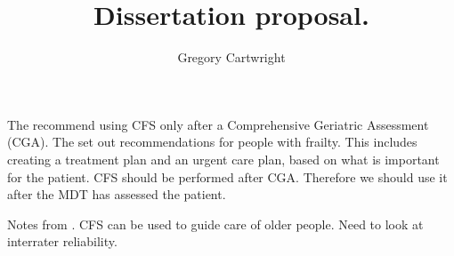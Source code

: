 \documentclass[12pt,a4paper,oneside,titlepage]{article}
\begin{document}
\author{Gregory Cartwright}
\title{Dissertation proposal.}
\maketitle
The \textcite[][page 8]{bgs:14} recommend using CFS only after a Comprehensive Geriatric Assessment (CGA).
The \textcite{bgs:14} set out recommendations for people with frailty. This includes creating a treatment plan and an urgent care plan, based on what is important for the patient.
CFS should be performed after CGA. Therefore we should use it after the MDT has assessed the patient.

Notes from \textcite{rockwood:05}. CFS can be used to guide care of older people. Need to look at interrater reliability.

\printbibliography[prenote=needsfixing]
\end{document}
